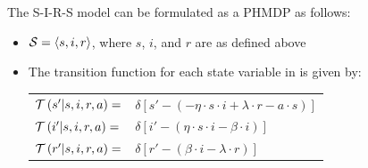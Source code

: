 The S-I-R-S model can be formulated as a PHMDP as follows:
\begin{itemize}
    \item {\footnotesize $ \mathcal{S} = \left\langle s, i, r \right\rangle$}, where $ s $, $ i $, and $ r $ are as defined above
    \item The transition function {\footnotesize \Transition} for each state variable in {\footnotesize \State} is given by:    \\
    {\footnotesize 
        \abovedisplayskip=5pt
        \belowdisplayskip=0pt
        \renewcommand{\arraystretch}{1.5}
        \begin{tabular}{ll}
            $ \mathcal{T}\left( s' | s, i, r, a \right) =$ & $ \delta \left[ s' - (- \eta \cdot s \cdot i + \lambda \cdot r -a \cdot s) \right] $ \\
            $ \mathcal{T}\left( i' | s, i, r, a \right) =$ & $ \delta \left[ i' - (\eta \cdot s \cdot i - \beta \cdot i) \right] $ \\
            $ \mathcal{T}\left( r' | s, i, r, a \right) =$ & $ \delta \left[ r' - (\beta \cdot i - \lambda \cdot r) \right] $ \\            
        \end{tabular}
    }%
\end{itemize} 

